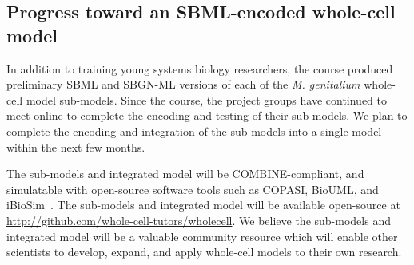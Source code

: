 \documentclass[journal,transmag]{IEEEtran}
\newcommand{\comment}[3]{\pdfmarkupcomment[markup=Highlight,color=yellow,author={#2}]{#1}{#3}}
\begin{document}


\subsection{Progress toward an SBML-encoded whole-cell model}
In addition to training young systems biology researchers, the course produced preliminary SBML and SBGN-ML versions of each of the \textit{M. genitalium} whole-cell model sub-models.
Since the course, the project groups have continued to meet online to complete the encoding and testing of their sub-models.
We plan to complete the encoding and integration of the sub-models into a single model within the next few months.

The sub-models and integrated model will be COMBINE-compliant, and simulatable with open-source software tools such as COPASI, BioUML, and iBioSim~\cite{Stevens2013}.
The sub-models and integrated model will be available open-source at \url{http://github.com/whole-cell-tutors/wholecell}.
We believe the sub-models and integrated model will be a valuable community resource which will enable other scientists to develop, expand, and apply whole-cell models to their own research.
\end{document}
